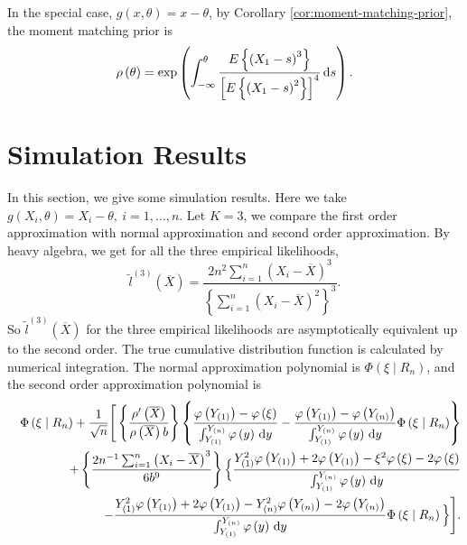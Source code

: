 In {the} special case,  $g\left(x,\theta\right)=x-\theta$, {by} Corollary \ref{cor:moment-matching-prior}, the moment matching prior is 
\[
	\rho\left(\theta\right)=\exp\left(\int_{-\infty}^{\theta}\frac{E\left\{\left(X_1-s\right)^3\right\}}{\left[E\left\{\left(X_1-s\right)^2\right\}\right]^4}\,\mathrm{d} s\right).
\]

\section{Simulation Results }


In this section, we give some simulation results. Here we take $g\left(X_{i},\theta\right)=X_{i}-\theta,\: i=1,\ldots,n$.
Let $K=3$, we compare the first order approximation with normal approximation
and second order approximation. By heavy algebra, we get for all the
three empirical likelihoods, 
\[
\tilde{l}^{\left(3\right)}\left(\overline{X}\right)=\frac{2n^{2}\sum_{i=1}^{n}\left(X_{i}-\overline{X}\right)^{3}}{\left\{ \sum_{i=1}^{n}\left(X_{i}-\overline{X}\right)^{2}\right\} ^{3}}.
\]
So  $\tilde{l}^{\left(3\right)}\left(\overline{X}\right)$ for
the three empirical likelihoods are asymptotically equivalent up to
the second order. The true cumulative distribution function is calculated
by numerical integration. The normal approximation polynomial
is $\Phi\left(\xi\mid R_{n}\right)$, and the second order approximation
polynomial is 
\begin{eqnarray*}
 &  & \Phi\left(\xi\mid R_{n}\right)+\frac{1}{\sqrt{n}}\Bigg[\left\{ \frac{\rho'\left(\overline{X}\right)}{\rho\left(\overline{X}\right)b}\right\} \left\{ \frac{\varphi\left(Y_{\left(1\right)}\right)-\varphi\left(\xi\right)}{\int_{Y_{\left(1\right)}}^{Y_{\left(n\right)}}\varphi\left(y\right)\,\mathrm{d} y}-\frac{\varphi\left(Y_{\left(1\right)}\right)-\varphi\left(Y_{\left(n\right)}\right)}{\int_{Y_{\left(1\right)}}^{Y_{\left(n\right)}}\varphi\left(y\right)\,\mathrm{d} y}\Phi\left(\xi\mid R_{n}\right)\right\} \\
 &  & +\left\{ \frac{2n^{-1}\sum_{i=1}^{n}\left(X_{i}-\overline{X}\right)^{3}}{6b^{9}}\right\} \Big\{\frac{Y_{\left(1\right)}^{2}\varphi\left(Y_{\left(1\right)}\right)+2\varphi\left(Y_{\left(1\right)}\right)-\xi^{2}\varphi\left(\xi\right)-2\varphi\left(\xi\right)}{\int_{Y_{\left(1\right)}}^{Y_{\left(n\right)}}\varphi\left(y\right)\,\mathrm{d} y}\\
 &  & -\frac{Y_{\left(1\right)}^{2}\varphi\left(Y_{\left(1\right)}\right)+2\varphi\left(Y_{\left(1\right)}\right)-Y_{\left(n\right)}^{2}\varphi\left(Y_{\left(n\right)}\right)-2\varphi\left(Y_{\left(n\right)}\right)}{\int_{Y_{\left(1\right)}}^{Y_{\left(n\right)}}\varphi\left(y\right)\,\mathrm{d} y}\Phi\left(\xi\mid R_{n}\right)\Big\}\Bigg].
\end{eqnarray*}
